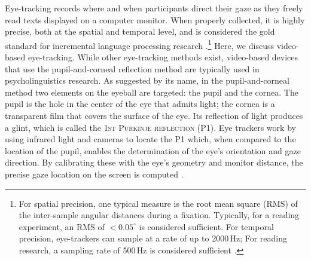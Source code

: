 \documentclass[12pt]{article}
\newcommand{\defn}[1]{\textsc{#1}}
\begin{document}
Eye-tracking records where and when participants direct their gaze as they freely read texts displayed on a computer monitor. When properly collected, it is highly precise, both at the spatial and temporal level, and is considered the gold standard for incremental language processing research \citep{holmqvist2011eye}.\footnote{For spatial precision, one typical measure is the root mean square (RMS) of the inter-sample angular distances during a fixation. Typically, for a reading experiment, an RMS of $<0.05^{\circ}$ is considered sufficient. For temporal precision, eye-trackers can sample at a rate of up to 2000\,Hz; For reading research, a sampling rate of 500\,Hz is considered sufficient \citep{rayner2012psychology, poole2006eye}.}
Here, we discuss video-based eye-tracking. While other eye-tracking methods exist, video-based devices that use the pupil-and-corneal reflection method are typically used in psycholinguistics research.
As suggested by its name, in the pupil-and-corneal method two elements on the eyeball are targeted: the pupil and the cornea. The pupil is the hole in the center of the eye that admits light; the cornea is a transparent film that covers the surface of the eye. Its reflection of light produces a glint, which is called the \defn{1st Purkinje reflection (P1)}. Eye trackers work by using infrared light and cameras to locate the P1 which, when compared to the location of the pupil, enables the determination of the eye's orientation and gaze direction. By calibrating these with the eye's geometry and monitor distance, the precise gaze location on the screen is computed \citep{holmqvist2011eye}. 
\end{document}
